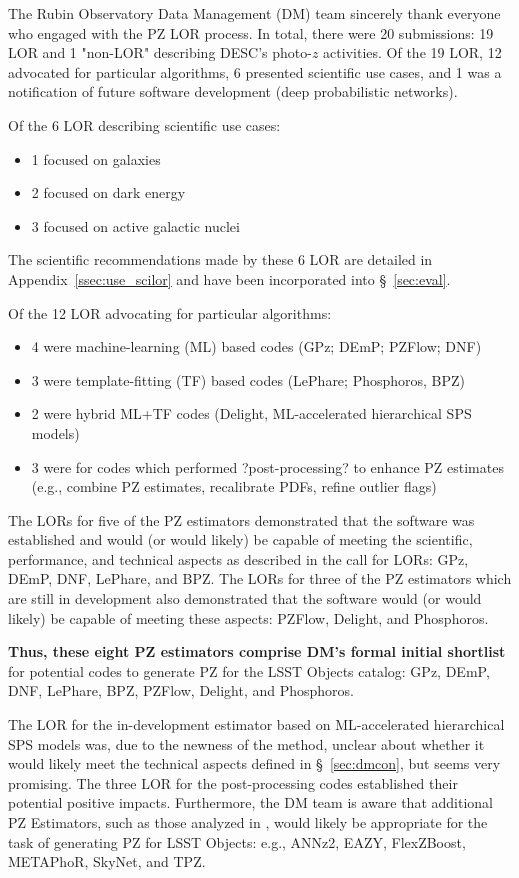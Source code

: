 \documentclass[DM,authoryear,toc]{lsstdoc}
\begin{document}
The Rubin Observatory Data Management (DM) team sincerely thank everyone who engaged with the PZ LOR process.
In total, there were 20 submissions: 19 LOR and 1 "non-LOR" describing DESC's photo-$z$ activities. 
Of the 19 LOR, 12 advocated for particular algorithms, 6 presented scientific use cases, and 1 was a notification of future software development (deep probabilistic networks).

Of the 6 LOR describing scientific use cases:
\begin{itemize}
\item1 focused on galaxies
\item2 focused on dark energy
\item3 focused on active galactic nuclei
\end{itemize}
The scientific recommendations made by these 6 LOR are detailed in Appendix~\ref{ssec:use_scilor} and have been incorporated into \S~\ref{sec:eval}.

Of the 12 LOR advocating for particular algorithms:
\begin{itemize}
\item 4 were machine-learning (ML) based codes (GPz; DEmP; PZFlow; DNF)
\item 3 were template-fitting (TF) based codes (LePhare; Phosphoros, BPZ)
\item 2 were hybrid ML+TF codes (Delight, ML-accelerated hierarchical SPS models)
\item 3 were for codes which performed ?post-processing? to enhance PZ estimates (e.g., combine PZ estimates, recalibrate PDFs, refine outlier flags)
\end{itemize}

The LORs for five of the PZ estimators demonstrated that the software was established and would (or would likely) be capable of meeting the scientific, performance, and technical aspects as described in the call for LORs: GPz, DEmP, DNF, LePhare, and BPZ.
The LORs for three of the PZ estimators which are still in development also demonstrated that the software would (or would likely) be capable of meeting these aspects: PZFlow, Delight, and Phosphoros. 

\textbf{Thus, these eight PZ estimators comprise DM's formal initial shortlist} for potential codes to generate PZ for the LSST Objects catalog: GPz, DEmP, DNF, LePhare, BPZ, PZFlow, Delight, and Phosphoros.

The LOR for the in-development estimator based on ML-accelerated hierarchical SPS models was, due to the newness of the method, unclear about whether it would likely meet the technical aspects defined in \S~\ref{sec:dmcon}, but seems very promising.
The three LOR for the post-processing codes established their potential positive impacts.
Furthermore, the DM team is aware that additional PZ Estimators, such as those analyzed in \cite{2020MNRAS.499.1587S}, would likely be appropriate for the task of generating PZ for LSST Objects: e.g., ANNz2, EAZY, FlexZBoost, METAPhoR, SkyNet, and TPZ.
\end{document}
